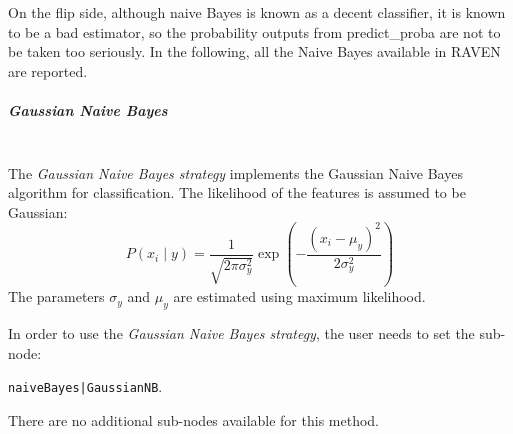 On the flip side, although naive Bayes is known as a decent classifier, it is
known to be a bad estimator, so the probability outputs from predict\_proba are
not to be taken too seriously.
%
In the following, all the Naive Bayes available in RAVEN are reported.
%
\subparagraph{Gaussian Naive Bayes}
\mbox{}
\\The \textit{Gaussian Naive Bayes strategy} implements the Gaussian Naive Bayes
algorithm for classification.
%
The likelihood of the features is assumed to be Gaussian:
\begin{equation}
P(x_i \mid y) = \frac{1}{\sqrt{2\pi\sigma^2_y}} \exp\left(-\frac{(x_i -
  \mu_y)^2}{2\sigma^2_y}\right)
\end{equation}
The parameters $\sigma_y$ and $\mu_y$ are estimated using maximum likelihood.

In order to use the \textit{Gaussian Naive Bayes strategy}, the user needs to
set the sub-node:

\texttt{naiveBayes|GaussianNB}.

There are no additional sub-nodes available for this method.
%

